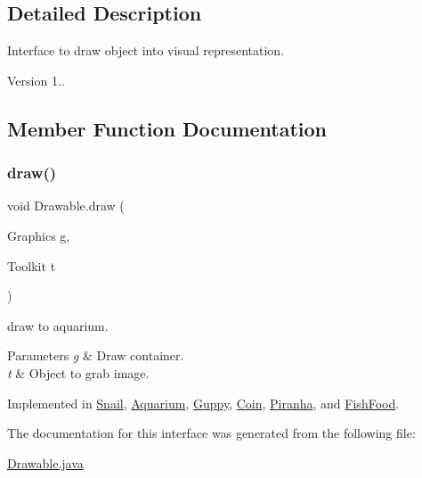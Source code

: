\subsection{Detailed Description}
Interface to draw object into visual representation. \begin{DoxyVersion}{Version}
1.. 
\end{DoxyVersion}


\subsection{Member Function Documentation}
\mbox{\label{interface_drawable_aaddafb212b3c8e60fcc742052570c893}} 
\subsubsection{\texorpdfstring{draw()}{draw()}}
{\footnotesize\ttfamily void Drawable.\+draw (\begin{DoxyParamCaption}\item[{Graphics}]{g,  }\item[{Toolkit}]{t }\end{DoxyParamCaption})}

draw to aquarium. 
\begin{DoxyParams}{Parameters}
{\em g} & Draw container. \\
\hline
{\em t} & Object to grab image. \\
\hline
\end{DoxyParams}


Implemented in \mbox{\hyperlink{class_snail_aa39dc71c305e7034af0438f036232e43}{Snail}}, \mbox{\hyperlink{class_aquarium_af6a186c92c1f91f92ae382416b77d3c3}{Aquarium}}, \mbox{\hyperlink{class_guppy_ad04fab448adc11ff3eecf3a76c64781b}{Guppy}}, \mbox{\hyperlink{class_coin_ae0c35ffd80b39f26f43d287da0565d0b}{Coin}}, \mbox{\hyperlink{class_piranha_a8a06429a9c5b42fb4246f48c54d6cf78}{Piranha}}, and \mbox{\hyperlink{class_fish_food_a061d353336adc633607668e8d8a73b25}{Fish\+Food}}.



The documentation for this interface was generated from the following file\+:\begin{DoxyCompactItemize}
\item 
\mbox{\hyperlink{_drawable_8java}{Drawable.\+java}}\end{DoxyCompactItemize}
